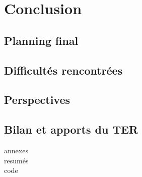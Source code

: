 \documentclass[12pt,a4paper]{report}
\theoremstyle{definition}
\begin{document}
\chapter{Conclusion}
\section{Planning final}

\section{Difficultés rencontrées}

\section{Perspectives}

\section{Bilan et apports du TER}
annexes\\
resumés\\
code



\end{document}
